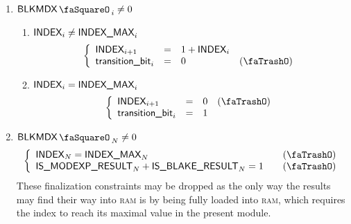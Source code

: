 \begin{enumerate}[resume]
        \item \If $\blkMdxStamp_{i} \neq 0$ \Then
                \begin{enumerate}
                        \item \If $\textsf{INDEX}_{i} \neq \textsf{INDEX\_MAX}_{i}$ \Then
                                \[
                                        \left\{ \begin{array}{lclr}
                                                \index_{i + 1}        & = & 1 + \index_{i} \\
                                                \locTransitionBit_{i} & = & 0               & (\trash) \\
                                        \end{array} \right.
                                \] 
                        \item \If $\textsf{INDEX}_{i} =    \textsf{INDEX\_MAX}_{i}$ \Then
                                \[
                                        \left\{ \begin{array}{lclr}
                                                \index_{i + 1}        & = & 0  & (\trash) \\
                                                \locTransitionBit_{i} & = & 1 \\
                                        \end{array} \right.
                                \] 
                \end{enumerate}
        \item \If $\blkMdxStamp_{N} \neq 0$ \Then
                \[
                        \left\{ \begin{array}{lcl}
                                \index          _{N}                        = \indexMax_{N} & \quad(\trash) \\
                                \isModexpResult _{N} + \isBlakeResult  _{N} = 1             & \quad(\trash) \\
                        \end{array} \right.
                \]
                \saNote{}\label{blkmdx: finalization constraints are useless} These finalization constraints may be dropped as the only way the results may find their way into \textsc{ram} is by being fully loaded into \textsc{ram}, which requires the index to reach its maximal value in the present module.
\end{enumerate}
